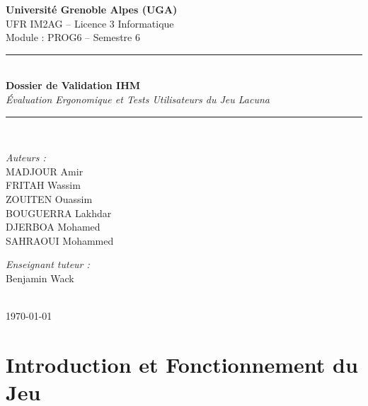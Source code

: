\documentclass[11pt,a4paper]{article}
\begin{document}
\begin{titlepage}
    \centering
    \vspace*{1.5cm}
    {\large\bfseries Université Grenoble Alpes (UGA)}\\[0.2cm]
    {\large UFR IM2AG -- Licence 3 Informatique}\\[0.5cm]
    {\large Module : PROG6 -- Semestre 6}\\[2.5cm]
    
    \rule{\linewidth}{1.5pt}\\[0.5cm]
    {\huge\bfseries Dossier de Validation IHM}\\[0.3cm]
    {\Large\itshape Évaluation Ergonomique et Tests Utilisateurs du Jeu Lacuna}\\[0.5cm]
    \rule{\linewidth}{1.5pt}\\[2.5cm]
    
    \begin{minipage}[t]{0.48\textwidth}
        \begin{flushleft} \large
            \emph{Auteurs :}\\
            MADJOUR Amir\\
            FRITAH Wassim\\
            ZOUITEN Ouassim\\
            BOUGUERRA Lakhdar\\
            DJERBOA Mohamed\\
            SAHRAOUI Mohammed
        \end{flushleft}
    \end{minipage}
    \hfill
    \begin{minipage}[t]{0.45\textwidth}
        \begin{flushright} \large
            \emph{Enseignant tuteur :}\\
            Benjamin Wack
        \end{flushright}
    \end{minipage}\\[1.5cm]
    
    \vfill
    {\large \today}
\end{titlepage}

\tableofcontents
\newpage

\section{Introduction et Fonctionnement du Jeu}
\end{document}
